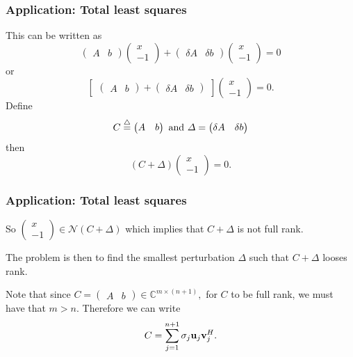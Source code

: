 \documentclass{beamer}
\begin{document}
\begin{frame}\frametitle{Application:  Total least squares}
	This can be written as
	\[ 
		\begin{pmatrix}
	    	A & b
	  	\end{pmatrix}
	  	\begin{pmatrix}
	    	x \\ -1
	  	\end{pmatrix}
	  + \begin{pmatrix}
	    	\delta A & \delta b
	  	\end{pmatrix}
	  	\begin{pmatrix}
	    	x \\-1
	  	\end{pmatrix} = 0
	\]
	or
	\[ 
		\begin{bmatrix}
			\begin{pmatrix}
	    		A & b
	  		\end{pmatrix} 
	  		+ 
	  		\begin{pmatrix}
	    		\delta A & \delta b
	  		\end{pmatrix}	
		\end{bmatrix}
		\begin{pmatrix}
	    	x\\-1
	  	\end{pmatrix} = 0.
	\] 	
	Define
	\[ 
		C \stackrel{\triangle}{=} \begin{pmatrix}
	    			A  & b
	  			 \end{pmatrix}
	  	\text{ and } 
	  	\Delta = \begin{pmatrix}
	    			\delta A & \delta b
	  			 \end{pmatrix}
	\]
	then 
	\[ 
		(C + \Delta)\begin{pmatrix}
	    				x \\ -1
	  				 \end{pmatrix} = 0.
	\]
\end{frame}

\begin{frame}\frametitle{Application:  Total least squares}
	So 
	\(
		\begin{pmatrix}
	    	x \\ -1
	  	\end{pmatrix} \in \mathcal{N}(C+\Delta) 
	\)
	which implies that $C + \Delta$ 
	is not full rank.	
	
	\vfill
	
	The problem is then to find the smallest perturbation $\Delta$ such that $C+\Delta$ looses rank.
	
	\vfill
	
	Note that since
	\(
		C = \begin{pmatrix}
	    		A & b
	  		\end{pmatrix}
	  	\in \mathbb{C}^{m\times (n+1)},
	\) 
	for $C$ to be full rank, we must have that $m>n$. 
	Therefore we can write
	\[
		C = \sum_{j=1}^{n+1}\sigma_j\mathbf{u}_j\mathbf{v}_j^H.
	\]
\end{frame}
\end{document}
